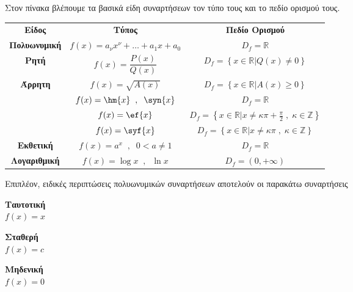\documentclass[twoside,nofonts,ektypwsh,math,spyros]{frontisthrio}
\begin{document}
Στον πίνακα βλέπουμε τα βασικά είδη συναρτήσεων τον τύπο τους και το πεδίο ορισμού τους.
\begin{center}
\begin{longtable}{ccc}
\hline \rule[-2ex]{0pt}{5.5ex}\textbf{Είδος} & \textbf{Τύπος} & \textbf{Πεδίο Ορισμού} \\ 
\hhline{===} \rule[-2ex]{0pt}{5.5ex} \textbf{Πολυωνυμική} & $ f(x)=a_\nu x^\nu+\ldots+a_1x+a_0 $ & $ D_f=\mathbb{R} $ \\
\rule[-2ex]{0pt}{5.5ex} \textbf{Ρητή} & $ f(x)=\dfrac{P(x)}{Q(x)} $ & $ D_f=\left\lbrace\left.  x\in\mathbb{R}\right| Q(x)\neq0\right\rbrace $  \\
\rule[-2ex]{0pt}{5.5ex} \textbf{Άρρητη} & $ f(x)=\sqrt{A(x)} $ & $ D_f=\left\lbrace\left. x\in\mathbb{R}\right| A(x)\geq0\right\rbrace $ \\
\hhline{~--}\rule[-2ex]{0pt}{5.5ex} \multirow{5}{*}{\textbf{Τριγωνομετρική}} & $ f(x)=\hm{x}\;\;,\;\;\syn{x} $ & $ D_f=\mathbb{R} $ \\ 
\rule[-2ex]{0pt}{5.5ex}  & $ f(x)=\ef{x} $ & $ D_f=\left\lbrace\left.x\in\mathbb{R}\right| x\neq\kappa\pi+\frac{\pi}{2}\;,\;\kappa\in\mathbb{Z}\right\rbrace $ \\ 
\rule[-2ex]{0pt}{5.5ex}  & $ f(x)=\syf{x} $ & $ D_f=\left\lbrace\left.x\in\mathbb{R}\right| x\neq\kappa\pi\;,\;\kappa\in\mathbb{Z}\right\rbrace $ \\ 
\hhline{~--}\rule[-2ex]{0pt}{5.5ex} \textbf{Εκθετική} & $ f(x)=a^x\;\;,\;\;0<a\neq1 $ & $ D_f=\mathbb{R} $ \\ 
\rule[-2ex]{0pt}{5.5ex} \textbf{Λογαριθμική} & $ f(x)=\log{x}\;\;,\;\;\ln{x} $ & $ D_f=(0,+\infty) $ \\ 
\hline 
\end{longtable}
\end{center}
\vspace{-.8cm}
Επιπλέον, ειδικές περιπτώσεις πολυωνυμικών συναρτήσεων αποτελούν οι παρακάτω συναρτήσεις
\begin{center}
\begin{minipage}{2.5cm}
\textbf{Ταυτοτική}\\$ f(x)=x $
\end{minipage}\qquad
\begin{minipage}{2.5cm}
\textbf{Σταθερή}\\$ f(x)=c $
\end{minipage}\qquad
\begin{minipage}{2.5cm}
\textbf{Μηδενική}\\$ f(x)=0 $
\end{minipage}
\end{center}
\end{document}
